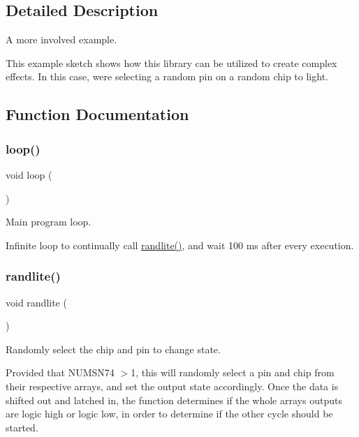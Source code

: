 \subsection{Detailed Description}
A more involved example. 

This example sketch shows how this library can be utilized to create complex effects. In this case, we\textquotesingle{}re selecting a random pin on a random chip to light. 

\subsection{Function Documentation}
\mbox{\label{SN74__RandomBlink_8ino_afe461d27b9c48d5921c00d521181f12f}} 
\subsubsection{\texorpdfstring{loop()}{loop()}}
{\footnotesize\ttfamily void loop (\begin{DoxyParamCaption}{ }\end{DoxyParamCaption})}



Main program loop. 

Infinite loop to continually call \hyperlink{SN74__RandomBlink_8ino_a9069fa50959f53362dad0f5038f45d60}{randlite()}, and wait 100 ms after every execution. \mbox{\label{SN74__RandomBlink_8ino_a9069fa50959f53362dad0f5038f45d60}} 
\subsubsection{\texorpdfstring{randlite()}{randlite()}}
{\footnotesize\ttfamily void randlite (\begin{DoxyParamCaption}{ }\end{DoxyParamCaption})}



Randomly select the chip and pin to change state. 

Provided that N\+U\+M\+S\+N74 $>$1, this will randomly select a pin and chip from their respective arrays, and set the output state accordingly. Once the data is shifted out and latched in, the function determines if the whole array\textquotesingle{}s outputs are logic high or logic low, in order to determine if the other cycle should be started. \mbox{\label{SN74__RandomBlink_8ino_a4fc01d736fe50cf5b977f755b675f11d}} 
